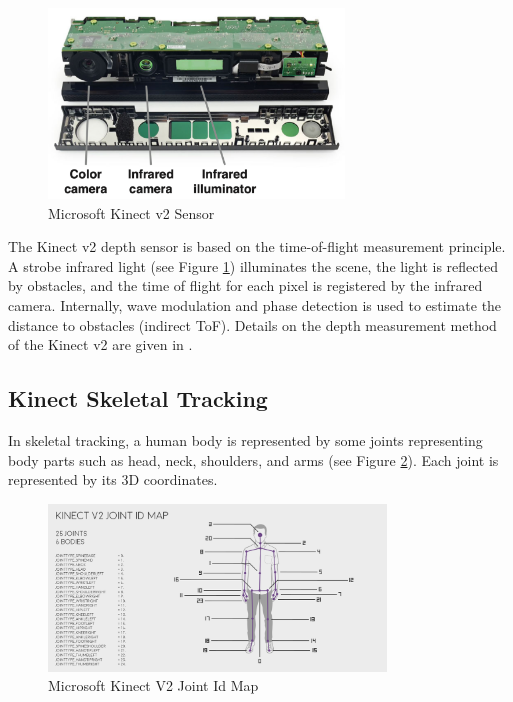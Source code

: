\begin{figure}[htbp]
  \centering\includegraphics[width=0.7\textwidth]{./img/kinect.png}
  \caption[Microsoft Kinect v2 Sensor]{Microsoft Kinect v2 Sensor \cite{Fankhauser2015}}\label{fig:kinect}
\end{figure}

\par The Kinect v2 depth sensor is based on the time-of-flight measurement principle. A strobe infrared light (see Figure \ref{fig:kinect}) illuminates the scene, the light is reflected by obstacles, and the time of flight for each pixel is registered by the infrared camera. Internally, wave modulation and phase detection is used to estimate the distance to obstacles (indirect ToF). Details on the depth measurement method of the Kinect v2 are given in \cite{Sell}.

\subsection*{Kinect Skeletal Tracking}
\par In skeletal tracking, a human body is represented by some joints representing body parts such as head, neck, shoulders, and arms (see Figure \ref{fig:skeletonmap}). Each joint is represented by its 3D coordinates.

\begin{figure}[htbp]
  \centering\includegraphics[width=0.8\textwidth]{./img/kinectskeleton.png}
\caption{Microsoft Kinect V2 Joint Id Map}\label{fig:skeletonmap}
\end{figure}

